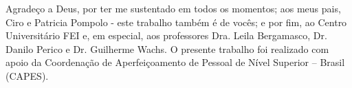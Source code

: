 \begin{agradecimentos}
Agradeço a Deus, por ter me sustentado em todos os momentos; aos meus pais, Ciro e Patricia Pompolo - este trabalho também é de vocês; e por fim, ao Centro Universitário FEI e, em especial, aos professores Dra. Leila Bergamasco, Dr. Danilo Perico e Dr. Guilherme Wachs.
O presente trabalho foi realizado com apoio da Coordenação de Aperfeiçoamento de Pessoal de Nível Superior – Brasil (CAPES).
\end{agradecimentos}
